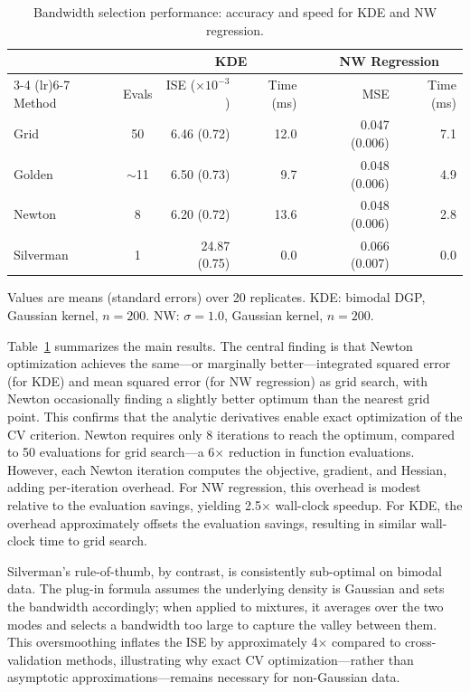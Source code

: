 \documentclass[11pt]{article}
\theoremstyle{definition}
\theoremstyle{remark}
\begin{document}
\begin{table}[t]
\centering
\caption{Bandwidth selection performance: accuracy and speed for KDE and NW regression.}
\label{tab:main-results}
\begin{tabular}{lcrrcrr}
\toprule
 & & \multicolumn{2}{c}{KDE} & & \multicolumn{2}{c}{NW Regression} \\
\cmidrule(lr){3-4} \cmidrule(lr){6-7}
Method & Evals & ISE ($\times 10^{-3}$) & Time (ms) & & MSE & Time (ms) \\
\midrule
Grid & 50 & 6.46 (0.72) & 12.0 & & 0.047 (0.006) & 7.1 \\
Golden & $\sim$11 & 6.50 (0.73) & 9.7 & & 0.048 (0.006) & 4.9 \\
Newton & 8 & 6.20 (0.72) & 13.6 & & 0.048 (0.006) & 2.8 \\
Silverman & 1 & 24.87 (0.75) & 0.0 & & 0.066 (0.007) & 0.0 \\
\bottomrule
\end{tabular}

\vspace{0.5em}
\footnotesize
Values are means (standard errors) over 20 replicates. KDE: bimodal DGP, Gaussian kernel, $n=200$. NW: $\sigma=1.0$, Gaussian kernel, $n=200$.
\end{table}

Table~\ref{tab:main-results} summarizes the main results.
The central finding is that Newton optimization achieves the same---or marginally better---integrated squared error (for KDE) and mean squared error (for NW regression) as grid search, with Newton occasionally finding a slightly better optimum than the nearest grid point.
This confirms that the analytic derivatives enable exact optimization of the CV criterion.
Newton requires only 8 iterations to reach the optimum, compared to 50 evaluations for grid search---a 6$\times$ reduction in function evaluations.
However, each Newton iteration computes the objective, gradient, and Hessian, adding per-iteration overhead.
For NW regression, this overhead is modest relative to the evaluation savings, yielding 2.5$\times$ wall-clock speedup.
For KDE, the overhead approximately offsets the evaluation savings, resulting in similar wall-clock time to grid search.

Silverman's rule-of-thumb, by contrast, is consistently sub-optimal on bimodal data.
The plug-in formula assumes the underlying density is Gaussian and sets the bandwidth accordingly; when applied to mixtures, it averages over the two modes and selects a bandwidth too large to capture the valley between them.
This oversmoothing inflates the ISE by approximately 4$\times$ compared to cross-validation methods, illustrating why exact CV optimization---rather than asymptotic approximations---remains necessary for non-Gaussian data.
\end{document}
